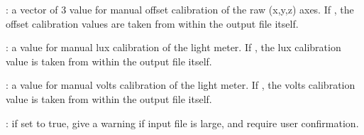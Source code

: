 \documentclass[a4paper]{book}
\begin{document}
\begin{Arguments}
\begin{ldescription}
: a vector of 3 value for manual offset calibration of the raw (x,y,z) axes.  If , the offset calibration values are taken from within the output file itself.\\{}

: a value for manual lux calibration of the light meter.  If , the lux calibration value is taken from within the output file itself.\\{}

: a value for manual volts calibration of the light meter.  If , the volts calibration value is taken from within the output file itself.\\{}

: if set to true, give a warning if input file is large, and require user confirmation.


\end{ldescription}
\end{Arguments}
%
\end{document}
